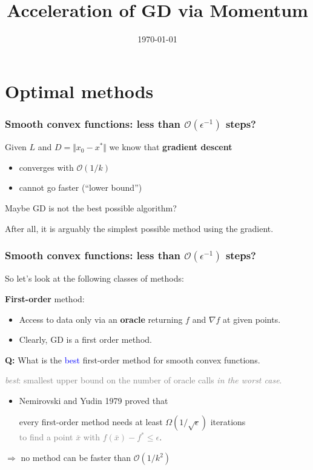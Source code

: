 \documentclass[aspectratio=149]{beamer}
\title{Acceleration of GD via Momentum}
\date{\today}
\begin{document}
\maketitle
\frame{\tableofcontents}

\section{Optimal methods}

\begin{frame}
  \frametitle{Smooth convex functions: less than $\mathcal{O}(\epsilon^{-1})$ steps?}
  Given $L$ and $D=\Vert x_0 - x^* \Vert$ we know that \textbf{gradient descent}
  \begin{itemize}
    \item converges with $\mathcal{O}(1/k)$
    \item cannot go faster (``lower bound'')
  \end{itemize}

  \begin{block}{}
    \centering
    Maybe GD is not the best possible algorithm? \medskip
  \end{block}


  After all, it is arguably the simplest possible method using the gradient.
\end{frame}


\begin{frame}
  \frametitle{Smooth convex functions: less than $\mathcal{O}(\epsilon^{-1})$ steps?}
  So let's look at the following classes of methods:

  \textbf{First-order} method:
  \begin{itemize}
    \item Access to data only via an \textbf{oracle} returning $f$ and $\nabla f$ at given points.
    \item Clearly, GD is a first order method.
  \end{itemize}

  \begin{block}{}
    \textbf{Q:} What is the \textcolor{blue}{best} first-order method for smooth convex functions.\\
  \end{block}
  \textcolor{gray}{\textit{best}: smallest upper bound on the number of oracle calls \textit{in the worst case}.}

  \begin{itemize}
    \item Nemirovski and Yudin 1979 proved that
          \begin{block}{}
            \center
            every first-order method needs at least $\Omega(1/\sqrt{\epsilon})$ iterations\\
          \textcolor{gray}{to find a point $\bar{x}$ with $f(\bar{x})-f^*\le \epsilon$}.
          \end{block}
  \end{itemize}
  $\Rightarrow$ no method can be faster than $\mathcal{O}(1/k^2)$
\end{frame}
\end{document}
